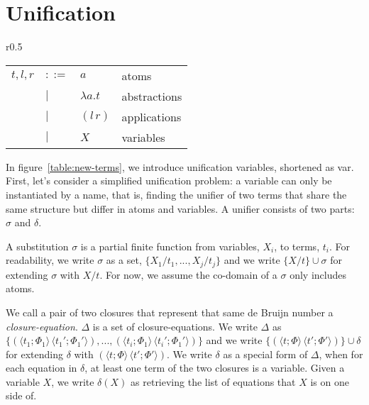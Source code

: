 \documentclass[a4paper,UKenglish]{lipics-v2016}
\newcommand{\clos}[2] {
  \langle #1; #2 \rangle
}
\newcommand{\app}[2] {
  (#1\, #2)
}
\newcommand{\pr}[2] {
 (#1\, #2)
}
\newcommand{\bd}[2] {
 #1/ #2
}
\begin{document}
\section{Unification}
\label{unify}
\begin{wrapfigure}{r}{0.5\textwidth}
  \caption{Unification terms\label{table:new-terms}}
    \begin{tabular}{r l l l}  
    $t,l,r$ & $::=$ & $a$ & atoms \\
    & $|$ & $\lambda a.t$ & abstractions \\
    & $|$ & $\app{l}{r}$ & applications \\
    & $|$ & $X$ & variables \\
    \end{tabular}
\end{wrapfigure}
In figure~\ref{table:new-terms}, we introduce unification variables, shortened as var.
First, let's consider a simplified unification problem:
a variable can only be instantiated by a name,
that is, finding the unifier of two terms
that share the same structure but differ in atoms and variables.
A unifier consists of two parts: $\sigma$ and $\delta$.
\begin{definition}
  A substitution $\sigma$ is a partial finite function from variables, $X_i$, to terms, $t_i$.
  For readability, we write $\sigma$ as a set, $\{\bd{X_1}{t_1}, ..., \bd{X_j}{t_j}\}$
  and we write $\{\bd{X}{t}\} \cup \sigma$ for extending $\sigma$ with $\bd{X}{t}$.
  For now, we assume the co-domain of a $\sigma$ only includes atoms.
\end{definition}

\begin{definition}
  We call a pair of two closures that represent that same de Bruijn number
  a \emph{closure-equation}.
  $\Delta$ is a set of closure-equations.
  We write $\Delta$ as $\{\pr{\clos{t_1}{\Phi_1}}{\clos{t_1'}{\Phi_1'}}, ..., \pr{\clos{t_i}{\Phi_1}}{\clos{t_i'}{\Phi_1'}}\}$ and
  we write $\{\pr{\clos{t}{\Phi}}{\clos{t'}{\Phi'}}\}\cup\delta$ for extending $\delta$ with $\pr{\clos{t}{\Phi}}{\clos{t'}{\Phi'}}$.
  We write $\delta$ as a special form of $\Delta$, when for each equation in $\delta$, at least one term of the two closures is a variable.
  Given a variable $X$, we write $\delta(X)$ as retrieving the list of equations that $X$ is on one side of.
\end{definition}
\end{document}
